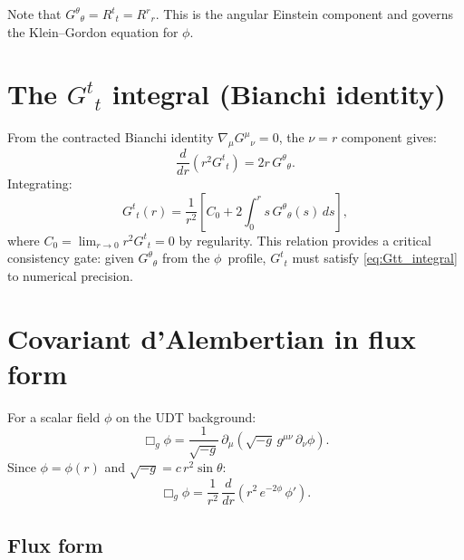 \documentclass[11pt,letterpaper]{article}
\numberwithin{equation}{section}
\begin{document}
Note that $G^\theta{}_\theta = R^t{}_t = R^r{}_r$. This is the angular
Einstein component and governs the Klein--Gordon equation for $\phi$.

\section{The $G^t{}_t$ integral (Bianchi identity)}
\label{sec:bianchi}

From the contracted Bianchi identity $\nabla_\mu G^\mu{}_\nu = 0$, the $\nu=r$
component gives:
\begin{equation}
\label{eq:bianchi_radial}
  \frac{d}{dr}\!\left(r^2 G^t{}_t\right) = 2r\,G^\theta{}_\theta.
\end{equation}
Integrating:
\begin{equation}
\label{eq:Gtt_integral}
  G^t{}_t(r) = \frac{1}{r^2}\!\left[C_0 + 2\int_0^r s\,G^\theta{}_\theta(s)\,ds\right],
\end{equation}
where $C_0 = \lim_{r\to 0} r^2 G^t{}_t = 0$ by regularity. This relation
provides a critical consistency gate: given $G^\theta{}_\theta$ from the
$\phi$~profile, $G^t{}_t$ must satisfy \eqref{eq:Gtt_integral} to numerical
precision.

\section{Covariant d'Alembertian in flux form}
\label{sec:dalembert}

For a scalar field $\phi$ on the UDT background:
\begin{equation}
\label{eq:box_general}
  \Box_g\phi = \frac{1}{\sqrt{-g}}\,\partial_\mu\!\left(\sqrt{-g}\,g^{\mu\nu}\,\partial_\nu\phi\right).
\end{equation}
Since $\phi = \phi(r)$ and $\sqrt{-g} = c\,r^2\sin\theta$:
\begin{equation}
\label{eq:box_radial}
  \Box_g\phi = \frac{1}{r^2}\,\frac{d}{dr}\!\left(r^2\,e^{-2\phi}\,\phi'\right).
\end{equation}

\subsection{Flux form}
\end{document}
